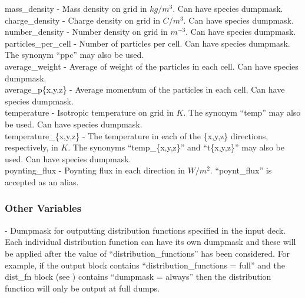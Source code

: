 {\emphtext mass\_density} - Mass density on grid in $kg/m^3$. Can have species
dumpmask.\\

{\emphtext charge\_density} - Charge density on grid in $C/m^3$. Can have
species dumpmask.\\

{\emphtext number\_density} - Number density on grid in $m^{-3}$. Can have
species dumpmask.\\

{\emphtext particles\_per\_cell} - Number of particles per cell. Can have
species dumpmask.  The synonym ``ppc'' may also be used.\\

{\emphtext average\_weight} - Average of weight of the particles in each cell.
Can have species dumpmask.\\

{\emphtext average\_p\{x,y,z\}} - Average momentum of the particles in each
cell.  Can have species dumpmask.\\

{\emphtext temperature} - Isotropic temperature on grid in $K$. The synonym
``temp'' may also be used. Can have species dumpmask.\\

{\emphtext temperature\_\{x,y,z\}} - The temperature in each of the \{x,y,z\}
directions, respectively, in $K$. The synonyms ``temp\_\{x,y,z\}'' and
``t\{x,y,z\}'' may also be used. Can have species dumpmask.\\

{\emphtext poynting\_flux} - Poynting flux in each direction in $W/m^2$.
``poynt\_flux'' is accepted as an alias.\\


\subsubsection{Other Variables}

\hspace*{\parindent}%
{} - Dumpmask for outputting distribution
functions specified in the input deck. Each individual distribution function
can have its own dumpmask and these will be applied after the value of
``distribution\_functions'' has been considered. For example, if the
output block contains ``distribution\_functions = full'' and the dist\_fn
block (see ) contains ``dumpmask = always'' then the
distribution function will only be output at full dumps.\\

